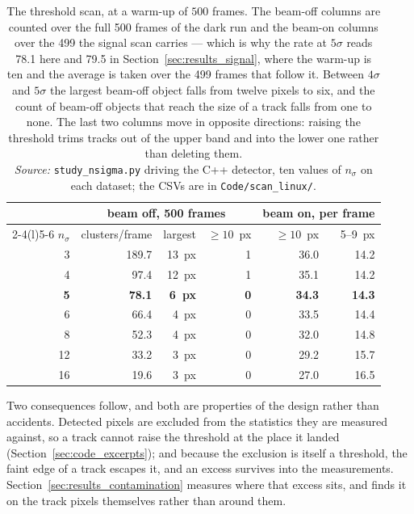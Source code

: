 \documentclass[a4paper,headsepline,oneside,11pt]{scrartcl}
\newcommand{\figsource}[1]{\\[3pt]{\footnotesize\emph{Source:} #1}}
\begin{document}
\begin{table}[htbp]
  \centering
  \begin{tabular}{@{}r rrr rr@{}}
    \toprule
    & \multicolumn{3}{c}{beam off, 500 frames} & \multicolumn{2}{c}{beam on, per frame} \\
    \cmidrule(r){2-4}\cmidrule(l){5-6}
    $n_\sigma$ & clusters/frame & largest & $\geq 10$~px & $\geq 10$~px & 5--9~px \\
    \midrule
     3 & 189.7 & 13~px & 1 & 36.0 & 14.2 \\
     4 &  97.4 & 12~px & 1 & 35.1 & 14.2 \\
     \textbf{5} &  \textbf{78.1} & \textbf{6~px} & \textbf{0} & \textbf{34.3} & \textbf{14.3} \\
     6 &  66.4 &  4~px & 0 & 33.5 & 14.4 \\
     8 &  52.3 &  4~px & 0 & 32.0 & 14.8 \\
    12 &  33.2 &  3~px & 0 & 29.2 & 15.7 \\
    16 &  19.6 &  3~px & 0 & 27.0 & 16.5 \\
    \bottomrule
  \end{tabular}
  \caption{The threshold scan, at a warm-up of $500$ frames. The beam-off
  columns are counted over the full 500 frames of the dark run and the beam-on
  columns over the 499 the signal scan carries --- which is why the rate at $5\sigma$ reads
  \num{78.1} here and \num{79.5} in Section~\ref{sec:results_signal}, where the
  warm-up is ten and the average is taken over the 499 frames that follow it.
  Between $4\sigma$ and $5\sigma$ the largest beam-off object falls from twelve
  pixels to six, and the count of beam-off objects that reach the size of a
  track falls from one to none. The last two columns move in opposite
  directions: raising the threshold trims tracks out of the upper band and into
  the lower one rather than deleting them.\figsource{\texttt{study\_nsigma.py} driving the C++ detector, ten
  values of $n_\sigma$ on each dataset; the CSVs are in
  \texttt{Code/scan\_linux/}.}}
  \label{tab:nsigma}
\end{table}


Two consequences follow, and both are properties of the design rather than
accidents. Detected pixels are excluded from the statistics they are measured
against, so a track cannot raise the threshold at the place it landed
(Section~\ref{sec:code_excerpts}); and because the exclusion is itself a
threshold, the faint edge of a track escapes it, and an excess survives into the
measurements. Section~\ref{sec:results_contamination} measures where that excess
sits, and finds it on the track pixels themselves rather than around
  them.
\end{document}

